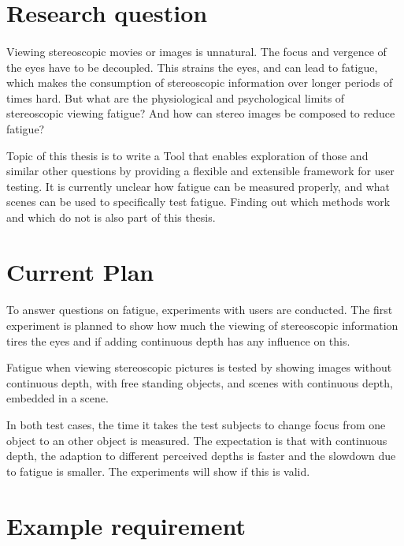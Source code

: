 \documentclass[11pt]{scrartcl}
\begin{document}
\begin{multicols}{2}


\section{Research question}
\paragraph{}
Viewing stereoscopic movies or images is unnatural. The focus and vergence of the eyes have to be decoupled. This strains the eyes, and can lead to fatigue, which makes the consumption of stereoscopic information over longer periods of times hard. But what are the physiological and psychological limits of stereoscopic viewing fatigue? And how can stereo images be composed to reduce fatigue?

Topic of this thesis is to write a Tool that enables exploration of those and similar other questions by providing a flexible and extensible framework for user testing. It is currently unclear how fatigue can be measured properly, and what scenes can be used to specifically test fatigue. Finding out which methods work and which do not is also part of this thesis.

\section{Current Plan}
\paragraph{}
To answer questions on fatigue, experiments with users are conducted. The first experiment is planned to show how much the viewing of stereoscopic information tires the eyes and if adding continuous depth has any influence on this.

Fatigue when viewing stereoscopic pictures is tested by showing images without continuous depth, with free standing objects, and scenes with continuous depth, embedded in a scene.

In both test cases, the time it takes the test subjects to change focus from one object to an other object is measured. The expectation is that with continuous depth, the adaption to different perceived depths is faster and the slowdown due to fatigue is smaller. The experiments will show if this is valid.

\section{Example requirement}

\end{multicols}
\end{document}
